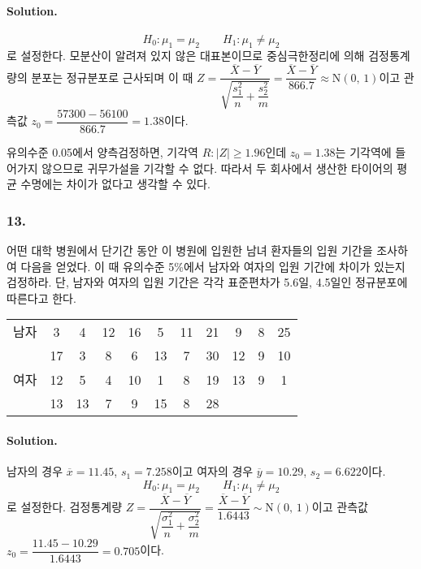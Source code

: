 \paragraph{Solution.}
\[H_0:\mu_1=\mu_2 \qquad H_1:\mu_1\neq\mu_2\]
로 설정한다. 모분산이 알려져 있지 않은 대표본이므로 중심극한정리에 의해 검정통계량의 분포는 정규분포로 근사되며
이 때 $Z=\dfrac{\overline{X}-\overline{Y}}{\sqrt{\dfrac{s_1^2}{n}+\dfrac{s_2^2}{m}}}
=\dfrac{\overline{X}-\overline{Y}}{866.7} \approx \mathrm{N}\left(0,\,1\right)$이고 관측값 $z_0=\dfrac{57300-56100}{866.7}=1.38$이다.

유의수준 0.05에서 양측검정하면, 기각역 $R:\left|Z\right|\geq 1.96$인데
$z_0=1.38$는 기각역에 들어가지 않으므로 귀무가설을 기각할 수 없다. 따라서 두 회사에서 생산한 타이어의 평균 수명에는 차이가 없다고 생각할 수 있다.

\subsubsection{13.} 어떤 대학 병원에서 단기간 동안 이 병원에 입원한 남녀 환자들의 입원 기간을 조사하여 다음을 얻었다. 이 때 유의수준 5\%에서
남자와 여자의 입원 기간에 차이가 있는지 검정하라. 단, 남자와 여자의 입원 기간은 각각 표준편차가 5.6일, 4.5일인 정규분포에 따른다고 한다.

\begin{center}
    \begin{tabular}{l|cccccccccc}
        \hline
        남자 & 3 & 4 & 12 & 16 & 5 & 11 & 21 & 9 & 8 & 25 \\
            & 17 & 3 & 8 & 6 & 13 & 7 & 30 & 12 & 9 & 10 \\
        \hline
        여자 & 12 & 5 & 4 & 10 & 1 & 8 & 19 & 13 & 9 & 1 \\
            & 13 & 13 & 7 & 9 & 15 & 8 & 28 & & & \\
        \hline
    \end{tabular}
\end{center}

\paragraph{Solution.} 남자의 경우 $\overline{x}=11.45$, $s_1=7.258$이고 여자의 경우 $\overline{y}=10.29$, $s_2=6.622$이다.
\[H_0:\mu_1=\mu_2 \qquad H_1:\mu_1\neq\mu_2\]
로 설정한다. 검정통계량 $Z=\dfrac{\overline{X}-\overline{Y}}{\sqrt{\dfrac{\sigma_1^2}{n}+\dfrac{\sigma_2^2}{m}}}
=\dfrac{\overline{X}-\overline{Y}}{1.6443} \sim \mathrm{N}\left(0,\,1\right)$이고 관측값 $z_0=\dfrac{11.45-10.29}{1.6443}=0.705$이다.


